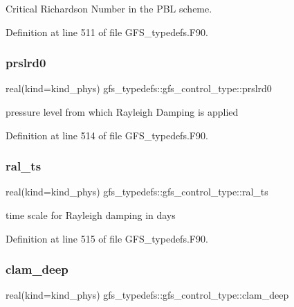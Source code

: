 Critical Richardson Number in the P\+BL scheme. 



Definition at line 511 of file G\+F\+S\+\_\+typedefs.\+F90.

\mbox{\label{structgfs__typedefs_1_1gfs__control__type_aee6807e4eb57989799eab24899ba6b08}} 
\subsubsection{prslrd0}
{\footnotesize\ttfamily real(kind=kind\+\_\+phys) gfs\+\_\+typedefs\+::gfs\+\_\+control\+\_\+type\+::prslrd0}



pressure level from which Rayleigh Damping is applied 



Definition at line 514 of file G\+F\+S\+\_\+typedefs.\+F90.

\mbox{\label{structgfs__typedefs_1_1gfs__control__type_a2bfc4ab06cd24f69b0e5977bceef2192}} 
\subsubsection{ral\+\_\+ts}
{\footnotesize\ttfamily real(kind=kind\+\_\+phys) gfs\+\_\+typedefs\+::gfs\+\_\+control\+\_\+type\+::ral\+\_\+ts}



time scale for Rayleigh damping in days 



Definition at line 515 of file G\+F\+S\+\_\+typedefs.\+F90.

\mbox{\label{structgfs__typedefs_1_1gfs__control__type_a12af6608d1f6dd42d59876886afd1127}} 
\subsubsection{clam\+\_\+deep}
{\footnotesize\ttfamily real(kind=kind\+\_\+phys) gfs\+\_\+typedefs\+::gfs\+\_\+control\+\_\+type\+::clam\+\_\+deep}




